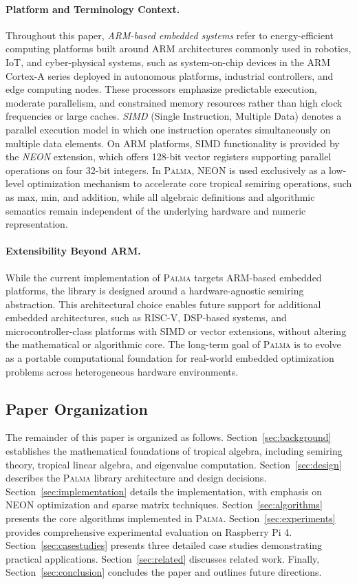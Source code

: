 \documentclass[11pt,a4paper]{article}
\theoremstyle{plain}
\theoremstyle{definition}
\newcommand{\palma}{\textsc{Palma}}
\begin{document}
\paragraph{Platform and Terminology Context.}
Throughout this paper, \emph{ARM-based embedded systems} refer to energy-efficient computing platforms built around ARM architectures commonly used in robotics, IoT, and cyber-physical systems, such as system-on-chip devices in the ARM Cortex-A series deployed in autonomous platforms, industrial controllers, and edge computing nodes. These processors emphasize predictable execution, moderate parallelism, and constrained memory resources rather than high clock frequencies or large caches. \emph{SIMD} (Single Instruction, Multiple Data) denotes a parallel execution model in which one instruction operates simultaneously on multiple data elements. On ARM platforms, SIMD functionality is provided by the \emph{NEON} extension, which offers 128-bit vector registers supporting parallel operations on four 32-bit integers. In \palma{}, NEON is used exclusively as a low-level optimization mechanism to accelerate core tropical semiring operations, such as max, min, and addition, while all algebraic definitions and algorithmic semantics remain independent of the underlying hardware and numeric representation.


\paragraph{Extensibility Beyond ARM.}
While the current implementation of \palma{} targets ARM-based embedded platforms, the library is designed around a hardware-agnostic semiring abstraction. This architectural choice enables future support for additional embedded architectures, such as RISC-V, DSP-based systems, and microcontroller-class platforms with SIMD or vector extensions, without altering the mathematical or algorithmic core. The long-term goal of \palma{} is to evolve as a portable computational foundation for real-world embedded optimization problems across heterogeneous hardware environments.

\subsection{Paper Organization}

The remainder of this paper is organized as follows. Section~\ref{sec:background} establishes the mathematical foundations of tropical algebra, including semiring theory, tropical linear algebra, and eigenvalue computation. Section~\ref{sec:design} describes the \palma{} library architecture and design decisions. Section~\ref{sec:implementation} details the implementation, with emphasis on NEON optimization and sparse matrix techniques. Section~\ref{sec:algorithms} presents the core algorithms implemented in \palma{}. Section~\ref{sec:experiments} provides comprehensive experimental evaluation on Raspberry Pi 4. Section~\ref{sec:casestudies} presents three detailed case studies demonstrating practical applications. Section~\ref{sec:related} discusses related work. Finally, Section~\ref{sec:conclusion} concludes the paper and outlines future directions.
\end{document}
